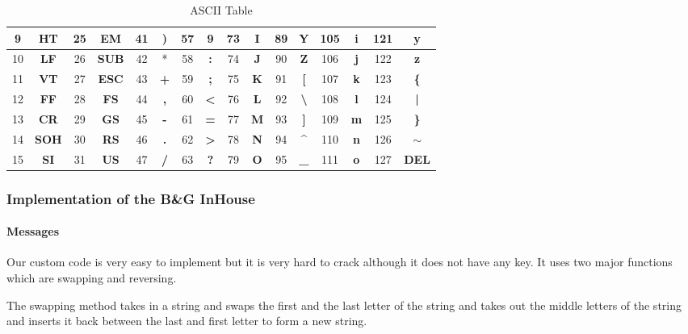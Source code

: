 \begin{table}[hbt!]
\begin{tabular}{|c|c|c|c|c|c|c|c|c|c|c|c|c|c|c|c|}
9  & \textbf{HT}  & 25 & \textbf{EM}  & 41 & \textbf{)}  & 57 & \textbf{9}              & 73 & \textbf{I} & 89 & \textbf{Y}                  & 105 & \textbf{i} & 121 & \textbf{y}      \\ \hline
10 & \textbf{LF}  & 26 & \textbf{SUB} & 42 & *           & 58 & \textbf{:}              & 74 & \textbf{J} & 90 & \textbf{Z}                  & 106 & \textbf{j} & 122 & \textbf{z}      \\ \hline
11 & \textbf{VT}  & 27 & \textbf{ESC} & 43 & \textbf{+}  & 59 & \textbf{;}              & 75 & \textbf{K} & 91 & \textbf{{[}}                & 107 & \textbf{k} & 123 & \textbf{\{}     \\ \hline
12 & \textbf{FF}  & 28 & \textbf{FS}  & 44 & \textbf{,}  & 60 & \textbf{\textless{}}    & 76 & \textbf{L} & 92 & \textbf{\textbackslash{}}   & 108 & \textbf{l} & 124 & \textbf{|}      \\ \hline
13 & \textbf{CR}  & 29 & \textbf{GS}  & 45 & \textbf{-}  & 61 & \textbf{=}              & 77 & \textbf{M} & 93 & \textbf{{]}}                & 109 & \textbf{m} & 125 & \textbf{\}}     \\ \hline
14 & \textbf{SOH} & 30 & \textbf{RS}  & 46 & \textbf{.}  & 62 & \textbf{\textgreater{}} & 78 & \textbf{N} & 94 & \textbf{\textasciicircum{}} & 110 & \textbf{n} & 126 & \textbf{$\sim$} \\ \hline
15 & \textbf{SI}  & 31 & \textbf{US}  & 47 & \textbf{/}  & 63 & \textbf{?}              & 79 & \textbf{O} & 95 & \textbf{\_}                 & 111 & \textbf{o} & 127 & \textbf{DEL}    \\ \hline

\end{tabular}
\caption{ASCII Table}
\label{tab:table3}

\end{table}

\subsubsection{Implementation of the B\&G InHouse}
\paragraph{Messages\\}
Our custom code is very easy to implement but it is very hard to crack although it does not have any key. It uses two major functions which are swapping and reversing.

The swapping method takes in a string and swaps the first and the last letter of the string and takes out the middle letters of the string and inserts it back between the last and first letter to form a new string.

